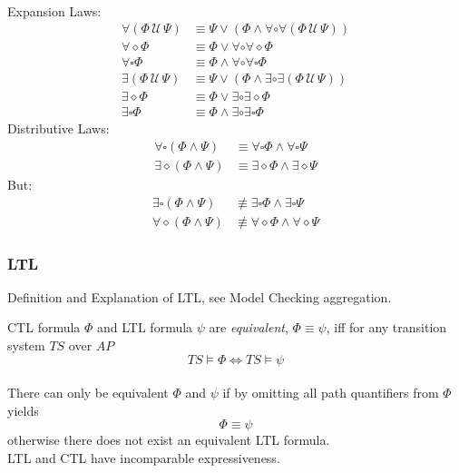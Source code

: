 \documentclass[a4paper, 10pt]{article}
\newcommand{\until}{\,\mathcal{U}\,}
\begin{document}
\begin{mdframed}
\begin{align*}
\end{align*}
Expansion Laws:
\begin{align*}
\forall(\Phi\until\Psi) &\equiv \Psi\vee(\Phi\wedge\forall\circ\forall(\Phi\until\Psi)) \\
\forall\diamond\Phi &\equiv \Phi\vee\forall\circ\forall\diamond\Phi \\
\forall\square\Phi &\equiv \Phi\wedge\forall\circ\forall\square\Phi \\
\exists(\Phi\until\Psi) &\equiv \Psi\vee(\Phi\wedge\exists\circ\exists(\Phi\until\Psi)) \\
\exists\diamond\Phi &\equiv \Phi\vee\exists\circ\exists\diamond\Phi \\
\exists\square\Phi &\equiv \Phi\wedge\exists\circ\exists\square\Phi
\end{align*}
Distributive Laws:
\begin{align*}
\forall\square(\Phi\wedge\Psi) &\equiv \forall\square\Phi\wedge\forall\square\Psi \\
\exists\diamond(\Phi\wedge\Psi) &\equiv \exists\diamond\Phi\wedge\exists\diamond\Psi
\end{align*}
But:
\begin{align*}
\exists\square(\Phi\wedge\Psi) &\not\equiv \exists\square\Phi\wedge\exists\square\Psi \\
\forall\diamond(\Phi\wedge\Psi) &\not\equiv \forall\diamond\Phi\wedge\forall\diamond\Psi
\end{align*}
\end{mdframed}

\subsubsection{LTL}
\begin{missing}
    Definition and Explanation of LTL, see Model Checking aggregation.
\end{missing}

\begin{mdframed}[roundcorner=5pt,
subtitlebelowline=false,subtitleaboveline=false,
subtitlebackgroundcolor=blue!30,
frametitlerule=true,
frametitlebackgroundcolor=blue!30,
frametitle={CTL and LTL equivalence}
]
CTL formula $\Phi$ and LTL formula $\psi$ are \emph{equivalent}, $\Phi\equiv\psi$, iff for any transition system $TS$ over $AP$
\[ TS\models\Phi \iff TS\models\psi \]
\\
There can only be equivalent $\Phi$ and $\psi$ if by omitting all path quantifiers from $\Phi$ yields \[ \Phi\equiv\psi \] otherwise there does not exist an equivalent LTL formula.
\\
\follows LTL and CTL have incomparable expressiveness.
\end{mdframed}
\end{document}
